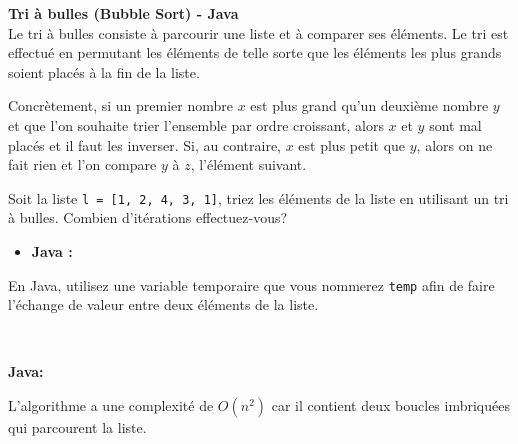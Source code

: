 \begin{Exercice} [20 minutes] \textbf{Tri à bulles (Bubble Sort) - Java} \optionnel \\
Le tri à bulles consiste à parcourir une liste et à comparer ses éléments. Le tri est effectué en permutant les éléments de telle sorte que les éléments les plus grands soient placés à la fin de la liste. 

Concrètement, si un premier nombre $x$ est plus grand qu'un deuxième nombre $y$ et que l'on souhaite trier l'ensemble par ordre croissant, alors $x$ et $y$ sont mal placés et il faut les inverser. Si, au contraire, $x$ est plus petit que $y$, alors on ne fait rien et l'on compare $y$ à $z$, l'élément suivant.

Soit la liste \lstinline{l = [1, 2, 4, 3, 1]}, triez les éléments de la liste en utilisant un tri à bulles. Combien d'itérations effectuez-vous?

\begin{itemize}
        \item \textbf{Java :}
             
    \end{itemize}
    
    \begin{conseil}
    En Java, utilisez une variable temporaire que vous nommerez \lstinline{temp} afin de faire l'échange de valeur entre deux éléments de la liste.
    \end{conseil}
    
    \ \\
    
    \begin{solution}
    \textbf{Java:}
     

    \end{solution}
    \begin{solution}
     

    \end{solution}

    \begin{solution}
    L'algorithme a une complexité de $O(n^2)$ car il contient deux boucles imbriquées qui parcourent la liste.
    \end{solution}
            

\end{Exercice}

